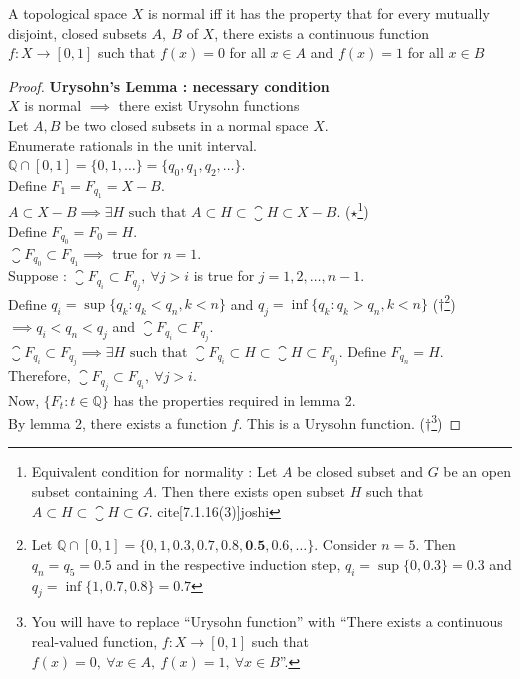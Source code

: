 \begin{theorem}
	A topological space $X$ is normal iff it has the property that for every mutually disjoint, closed subsets $A,\ B$ of $X$, there exists a continuous function \( f : X \to [0,1] \) such that \( f(x) = 0 \) for all $x \in A$ and \( f(x) = 1 \) for all \( x \in B \)
\end{theorem}
\begin{proof}
	\textbf{Urysohn's Lemma : necessary condition}\\
	$X$ is normal $\implies$ there exist Urysohn functions\\

	Let $A,B$ be two closed subsets in a normal space $X$.\\
	Enumerate rationals in the unit interval.\\
	$\mathbb{Q} \cap [0,1] = \{ 0, 1, \dotsc \} = \{ q_0, q_1, q_2, \dotsc \}$.\\
	Define $F_1 = F_{q_1} = X-B$. \\
	$A \subset X-B \implies\exists H \text{ such that } A \subset H \subset \closure{H} \subset X-B$.
	($\star$\footnote{Equivalent condition for normality : Let $A$ be closed subset and $G$ be an open subset containing $A$.
	Then there exists open subset $H$ such that $A \subset H \subset \closure{H} \subset G$.
	cite[7.1.16(3)]{joshi}})\\
	Define $F_{q_0} = F_0 = H$.\\

	$\closure{F_{q_0}} \subset F_{q_1} \implies $ true for $n = 1$.\\
	Suppose : $\closure{F_{q_i}} \subset F_{q_j},\ \forall j > i$ is true for $j = 1,2,\dots,n-1$.\\
	Define $q_i = \sup \{ q_k : q_k < q_n, k < n \}$ and $q_j = \inf \{ q_k : q_k > q_n, k < n \}$ ($\dag$\footnote{ Let $\mathbb{Q}\cap[0,1] = \{ 0,1,0.3,0.7,0.8,\textbf{0.5},0.6,\dotsc \}$.
	Consider $n = 5$.
	Then $q_n = q_5 = 0.5$ and in the respective induction step, $q_i = \sup\{0,0.3\} = 0.3$ and $q_j = \inf\{1,0.7,0.8\} = 0.7$}) \\
	$\implies q_i < q_n < q_j$ and $\closure{F_{q_i}} \subset F_{q_j}$.\\
	$\closure{F_{q_i}} \subset F_{q_j} \implies \exists H \text{ such that } \closure{F_{q_i}} \subset H \subset \closure{H} \subset F_{q_j}$.
	Define $F_{q_n} = H$.\\
	Therefore, $\closure{F_{q_j}} \subset F_{q_i},\ \forall j > i$.\\

	Now, $\{ F_t : t \in \mathbb{Q}\}$ has the properties required in lemma 2.\\
	By lemma 2, there exists a function $f$.
	This is a Urysohn function.
	($\dag$\footnote{You will have to replace ``Urysohn function'' with ``There exists a continuous real-valued function, $f : X \to [0,1]$ such that $f(x) = 0,\ \forall x \in A,\ f(x) = 1,\ \forall x \in B$''.})
\end{proof}

